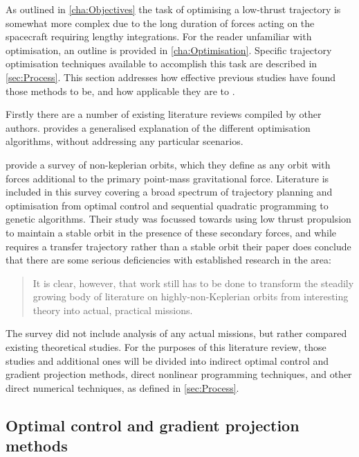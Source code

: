 As outlined in \autoref{cha:Objectives} the task of optimising a low-thrust trajectory is somewhat more complex due to the long duration of forces acting on the spacecraft requiring lengthy integrations. For the reader unfamiliar with optimisation, an outline is provided in \autoref{cha:Optimisation}. Specific trajectory optimisation techniques available to accomplish this task are described in \autoref{sec:Process}. This section addresses how effective previous studies have found those methods to be, and how applicable they are to \BW.

Firstly there are a number of existing literature reviews compiled by other authors. \textcite{Betts1998} provides a generalised explanation of the different optimisation algorithms, without addressing any particular scenarios. 

\textcite{McKay2011} provide a survey of non-keplerian orbits, which they define as any orbit with forces additional to the primary point-mass gravitational force. Literature is included in this survey covering a broad spectrum of trajectory planning and optimisation from optimal control and sequential quadratic programming to genetic algorithms. Their study was focussed towards using low thrust propulsion to maintain a stable orbit in the presence of these secondary forces, and while \BW requires a transfer trajectory rather than a stable orbit their paper does conclude that there are some serious deficiencies with established research in the area: 

\begin{quotation}It is clear, however, that work still has to be done to transform the steadily growing body of literature on highly-non-Keplerian orbits from interesting theory into actual, practical missions.
\end{quotation}

The survey did not include analysis of any actual missions, but rather compared existing theoretical studies. For the purposes of this literature review, those studies and additional ones will be divided into indirect optimal control and gradient projection methods, direct nonlinear programming techniques, and other direct numerical techniques, as defined in \autoref{sec:Process}.






\subsection{Optimal control and gradient projection methods} \label{sub:Optimal-control-lit}

